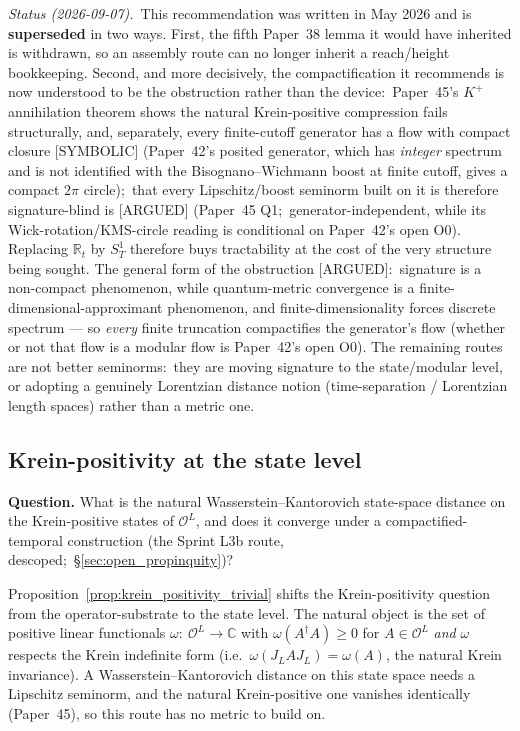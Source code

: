 \documentclass[11pt,a4paper]{article}
\theoremstyle{plain}
\theoremstyle{definition}
\newcommand{\Op}{\mathcal{O}}
\newcommand{\R}{\mathbb{R}}
\newcommand{\C}{\mathbb{C}}
\newcommand{\JL}{J_L}
\begin{document}
\emph{Status (2026-09-07).}\ This recommendation was written in May 2026
and is \textbf{superseded} in two ways.  First, the fifth Paper~38 lemma
it would have inherited is withdrawn, so an assembly route can no longer
inherit a reach/height bookkeeping.  Second, and more decisively, the
compactification it recommends is now understood to be the obstruction
rather than the device:\ Paper~45's $K^{+}$ annihilation theorem shows
the natural Krein-positive compression fails structurally, and,
separately, every finite-cutoff generator has a flow with compact
closure [SYMBOLIC] (Paper~42's
posited generator, which has \emph{integer} spectrum and is not identified
with the Bisognano--Wichmann boost at finite cutoff, gives a compact
$2\pi$ circle);\ that every Lipschitz/boost seminorm built on it is
therefore signature-blind is [ARGUED] (Paper~45 Q1;\ generator-independent,
while its Wick-rotation/KMS-circle reading is conditional on Paper~42's
open O0).  Replacing
$\R_t$ by $S^1_T$ therefore buys tractability at the cost of the very
structure being sought.  The general form of the obstruction [ARGUED]:\
signature is a non-compact phenomenon, while quantum-metric convergence
is a finite-dimensional-approximant phenomenon, and finite-dimensionality
forces discrete spectrum --- so \emph{every} finite truncation
compactifies the generator's flow (whether or not that flow is a
modular flow is Paper~42's open O0).  The remaining routes are not better
seminorms:\ they are moving signature to the state/modular level, or
adopting a genuinely Lorentzian distance notion (time-separation /
Lorentzian length spaces) rather than a metric one.

\subsection{Krein-positivity at the state level}\label{sec:open_state}

\textbf{Question.} What is the natural Wasserstein--Kantorovich
state-space distance on the Krein-positive states of $\Op^L$, and
does it converge under a compactified-temporal construction (the
Sprint L3b route, descoped;\ \S\ref{sec:open_propinquity})?

Proposition~\ref{prop:krein_positivity_trivial} shifts the
Krein-positivity question from the operator-substrate to the state
level. The natural object is the set of positive linear functionals
$\omega:\ \Op^L \to \C$ with $\omega(A^\dagger A) \ge 0$ for $A \in
\Op^L$ \emph{and} $\omega$ respects the Krein indefinite form (i.e.\
$\omega(\JL A \JL) = \omega(A)$, the natural Krein invariance). A
Wasserstein--Kantorovich distance on this state space needs a
Lipschitz seminorm, and the natural Krein-positive one vanishes
identically (Paper~45), so this route has no metric to build on.
\end{document}
